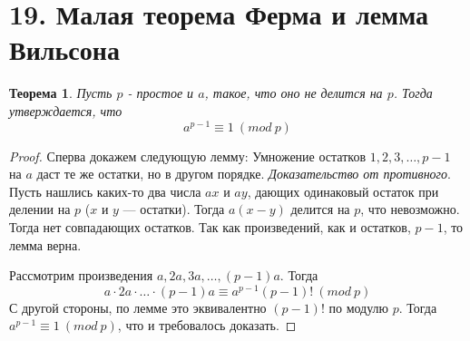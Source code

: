 \documentclass[a4paper,12pt]{article}
\newtheorem*{ther}{Теорема}
\begin{document}
        \section*{19. Малая теорема Ферма и лемма Вильсона}
        \begin{ther}
            Пусть $p$ - простое и $a$, такое, что оно не делится на $p$. Тогда утверждается, что
            \[
                a^{p - 1} \equiv 1 \ (mod \ p)
            \]
        \end{ther}

        \begin{proof}
            Сперва докажем следующую лемму: Умножение остатков $1, 2, 3, \ldots , p - 1$
            на $a$ даст те же остатки, но в другом порядке.
            \textit{Доказательство от противного}. Пусть нашлись каких-то два числа $ax$ и $ay$, дающих одинаковый
            остаток при делении на $p$ ($x$ и $y$ — остатки). Тогда $a(x - y)$ делится на $p$, что невозможно. Тогда
            нет совпадающих остатков. Так как произведений, как и остатков, $p - 1$, то лемма верна.


            Рассмотрим произведения $a, 2a, 3a, \ldots, (p - 1)a$. Тогда
            \[
            a \cdot 2a \cdot \ldots \cdot (p-1)a \equiv a^{p - 1}(p - 1)! \ (mod \ p)
            \]
            С другой стороны, по лемме это эквивалентно $(p - 1)!$ по модулю $p$. Тогда $a^{p-1} \equiv 1 \ (mod \ p)$, что и
            требовалось доказать.
        \end{proof}
\end{document}
